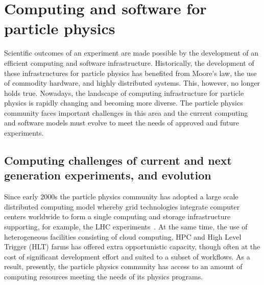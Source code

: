 \section{Computing and software for particle physics}

Scientific outcomes of an experiment are made possible by the development of an efficient computing and software infrastructure. Historically, the development of these infrastructures for particle physics has benefited from Moore's law, the use of commodity hardware, and highly  distributed systems.  This, however, no longer holds true. Nowadays, the landscape of computing infrastructure for particle physics is rapidly changing and becoming more diverse.  The particle physics community faces important challenges in this area and the current computing and software models must evolve to meet the needs of approved and future experiments. %


\subsection{Computing challenges of current and next generation experiments, and evolution}
Since early 2000s the particle physics community has adopted a large scale distributed computing model whereby grid technologies integrate computer centers worldwide to form a single computing and storage infrastructure supporting, for example, the LHC experiments~\cite{bib:IB-talk}. At the same time, the use of heterogeneous facilities consisting of cloud computing, HPC and High Level Trigger (HLT) farms has offered extra opportunistic capacity, though often at the cost of significant development effort and suited to a subset of workflows. As a result, presently, the particle physics community has access to an amount of computing resources meeting the needs of its physics programs.
 
